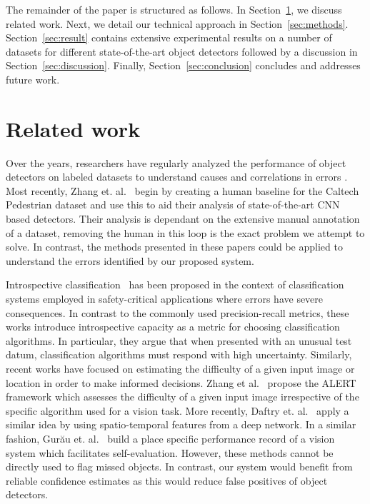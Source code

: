 \documentclass[letterpaper, 10 pt, journal, twoside]{IEEEtran}  %
\begin{document}
The remainder of the paper is structured as follows. In Section~\ref{sec:related_work}, we discuss related work. Next, we detail our technical approach in Section~\ref{sec:methods}. Section~\ref{sec:result} contains extensive experimental results on a number of datasets for different state-of-the-art object detectors followed by a discussion in Section~\ref{sec:discussion}. Finally, Section~\ref{sec:conclusion} concludes and addresses future work.


\section{Related work}
\label{sec:related_work}

Over the years, researchers have regularly analyzed the performance of object detectors on labeled datasets to understand causes and correlations in errors \cite{dollar2012pedestrian, agrawal2014analyzing, zhang2016far}. Most recently, Zhang et. al.~\cite{zhang2016far} begin by creating a human baseline for the Caltech Pedestrian dataset and use this to aid their analysis of state-of-the-art CNN based detectors. Their analysis is dependant on the extensive manual annotation of a dataset, removing the human in this loop is the exact problem we attempt to solve. In contrast, the methods presented in these papers could be applied to understand the errors identified by our proposed system.

Introspective classification~\cite{grimmett2016introspective,blair2014introspective} has been proposed in the context of classification systems employed in safety-critical applications where errors have severe consequences. In contrast to the commonly used precision-recall metrics, these works introduce introspective capacity as a metric for choosing classification algorithms. In particular, they argue that when presented with an unusual test datum, classification algorithms must respond with high uncertainty. 
Similarly, recent works have focused on estimating the difficulty of a given input image or location in order to make informed decisions. 
Zhang et al.~\cite{zhang2014predicting} propose the ALERT framework which assesses the difficulty of a given input image irrespective of the specific algorithm used for a vision task. More recently, Daftry et. al.~\cite{daftry2016introspective} apply a similar idea by using spatio-temporal features from a deep network. In a similar fashion, Gur\u{a}u et. al.~\cite{guruau2017learn} build a place specific performance record of a vision system which facilitates self-evaluation. 
 However, these methods cannot be directly used to flag missed objects. In contrast, our system would benefit from reliable confidence estimates as this would reduce false positives of object detectors. 
\end{document}

